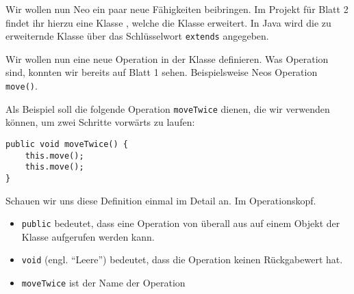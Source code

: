 
    Wir wollen nun Neo ein paar neue Fähigkeiten beibringen.
    Im Projekt für Blatt 2 findet ihr hierzu eine Klasse \ownclass{},
    welche die Klasse \superclass{}  erweitert. In Java wird die zu erweiternde Klasse über das Schlüsselwort \lstinline{extends} angegeben.

    Wir wollen nun eine neue Operation in der Klasse \ownclass{} definieren. Was Operation sind, konnten wir bereits auf Blatt 1 sehen. Beispielsweise Neos Operation \lstinline{move()}.

    Als Beispiel soll die folgende Operation \texttt{moveTwice} dienen, die wir verwenden können, um zwei Schritte vorwärts zu laufen:
    \begin{lstlisting}
public void moveTwice() {
    this.move();
    this.move();
}
    \end{lstlisting}
    Schauen wir uns diese Definition einmal im Detail an. Im Operationskopf.
    \begin{itemize}
    \item \lstinline{public} bedeutet, dass eine Operation von überall aus auf einem Objekt der Klasse aufgerufen werden kann.
    \item \lstinline{void} (engl. ``Leere'') bedeutet, dass die Operation keinen Rückgabewert hat.
    \item \lstinline{moveTwice} ist der Name der Operation
    \end{itemize}

